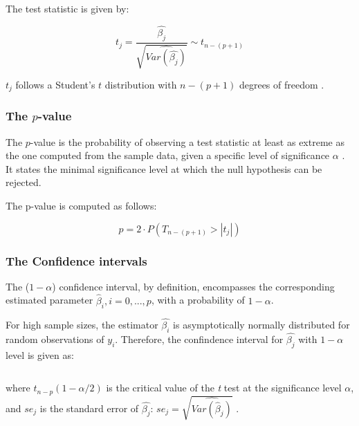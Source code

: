 \documentclass[12 pt]{scrartcl}
\numberwithin{equation}{section}
\begin{document}
The test statistic is given by:

\begin{equation}
    t_{j} = \frac{\hat{\beta_{j}}}{\sqrt{\widehat{Var(\hat{\beta_{j}})}}} \sim t_{n-(p+1)}
\end{equation}

$t_{j}$ follows a Student's $t$ distribution with $n-(p+1)$ degrees of freedom \cite[p.130-131]{regression}.

\subsubsection*{The $p$-value}
\label{subsubsec:The $p$-value}

The $p$-value is the probability of observing a test statistic at least as extreme as the one computed from the sample data,
given a specific level of significance $\alpha$ \cite[p.130-131]{regression}.
It states the minimal significance level at which the null hypothesis can be rejected.

The p-value is computed as follows:

\begin{equation}
    p = 2 \cdot P(T_{n-(p+1)} > |t_{j}|)
\end{equation}


\subsubsection*{The Confidence intervals}
\label{subsubsec:The Confidence intervals}

The ($1- \alpha$) confidence interval, by definition, 
encompasses the corresponding estimated parameter $\hat{\beta}_{i}, i = 0,..., p$, with a probability of $1-\alpha$.

For high sample sizes, the estimator $\hat{\beta_{i}}$ is asymptotically normally distributed for random observations of $y_{i}$. 
Therefore, the confindence interval for $\hat{\beta_{j}}$ with $1-\alpha$ level is given as:

\begin{equation}
    [\hat{\beta_{j}} - t_{n-p}(1- \alpha/2) \cdot se_{j}, \hat{\beta_{j}} + t_{n-p}(1- \alpha/2) \cdot se_{j}]
\end{equation}
\label{eq:confidence_interval}

where $t_{n-p}(1 - \alpha/2)$ is the critical value of the \textit{t} test at the significance level $\alpha$,
and $se_{j}$ is the standard error of $\hat{\beta_{j}}$: $se_{j} = \sqrt{\widehat{Var(\hat{\beta}_{j})}}$ \cite[p.131]{regression}.
\end{document}
